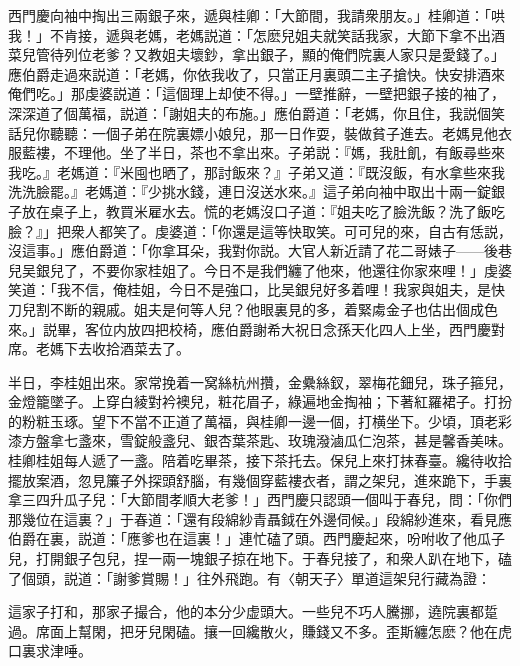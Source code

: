 西門慶向袖中掏出三兩銀子來，遞與桂卿：「大節間，我請衆朋友。」桂卿道：「哄我！」不肯接，遞與老媽，老媽説道：「怎麽兒姐夫就笑話我家，大節下拿不出酒菜兒管待列位老爹？又教姐夫壞鈔，拿出銀子，顯的俺們院裏人家只是愛錢了。」應伯爵走過來説道：「老媽，你依我收了，只當正月裏頭二主子搶快。快安排酒來俺們吃。」那虔婆説道：「這個理上却使不得。」一壁推辭，一壁把銀子接的袖了，深深道了個萬福，説道：「謝姐夫的布施。」應伯爵道：「老媽，你且住，我説個笑話兒你聽聽：一個子弟在院裏嫖小娘兒，那一日作耍，裝做貧子進去。老媽見他衣服藍褸，不理他。坐了半日，茶也不拿出來。子弟説：『媽，我肚飢，有飯尋些來我吃。』老媽道：『米囤也晒了，那討飯來？』子弟又道：『既沒飯，有水拿些來我洗洗臉罷。』老媽道：『少挑水錢，連日沒送水來。』這子弟向袖中取出十兩一錠銀子放在桌子上，教買米雇水去。慌的老媽沒口子道：『姐夫吃了臉洗飯？洗了飯吃臉？』」把衆人都笑了。虔婆道：「你還是這等快取笑。可可兒的來，自古有恁説，沒這事。」應伯爵道：「你拿耳朵，我對你説。大官人新近請了花二哥婊子——後巷兒吴銀兒了，不要你家桂姐了。今日不是我們纏了他來，他還往你家來哩！」虔婆笑道：「我不信，俺桂姐，今日不是強口，比吴銀兒好多着哩！我家與姐夫，是快刀兒割不断的親戚。姐夫是何等人兒？他眼裏見的多，着緊䖏金子也估出個成色來。」説畢，客位内放四把校椅，應伯爵謝希大祝日念孫天化四人上坐，西門慶對席。老媽下去收拾酒菜去了。

半日，李桂姐出來。家常挽着一窝絲杭州攢，金纍絲釵，翠梅花鈿兒，珠子箍兒，金燈籠墜子。上穿白綾對衿襖兒，粧花眉子，綠遍地金掏袖；下著紅羅裙子。打扮的粉粧玉琢。望下不當不正道了萬福，與桂卿一邊一個，打横坐下。少頃，頂老彩漆方盤拿七盞來，雪錠般盞兒、銀杏葉茶匙、玫瑰潑滷瓜仁泡茶，甚是馨香美味。桂卿桂姐每人遞了一盞。陪着吃畢茶，接下茶托去。保兒上來打抹春臺。纔待收拾擺放案酒，忽見簾子外探頭舒腦，有幾個穿藍褸衣者，謂之架兒，進來跪下，手裏拿三四升瓜子兒：「大節間孝順大老爹！」西門慶只認頭一個叫于春兒，問：「你們那幾位在這裏？」于春道：「還有段綿紗青聶鉞在外邊伺候。」段綿紗進來，看見應伯爵在裏，説道：「應爹也在這裏！」連忙磕了頭。西門慶起來，吩咐收了他瓜子兒，打開銀子包兒，捏一兩一塊銀子掠在地下。于春兒接了，和衆人趴在地下，磕了個頭，説道：「謝爹賞賜！」往外飛跑。有〈朝天子〉單道這架兒行藏為證：

這家子打和，那家子撮合，他的本分少虚頭大。一些兒不巧人騰挪，遶院裏都踅過。席面上幫閑，把牙兒閑磕。攘一回纔散火，賺錢又不多。歪斯纏怎麽？他在虎口裏求津唾。

